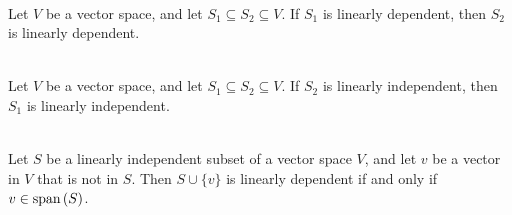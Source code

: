 \begin{theorem}
	\hfill\\
	Let $V$ be a vector space, and let $S_1 \subseteq S_2 \subseteq V$. If $S_1$ is linearly dependent, then $S_2$ is linearly dependent.
\end{theorem}

\begin{corollary}
	\hfill\\
	Let $V$ be a vector space, and let $S_1 \subseteq S_2 \subseteq V$. If $S_2$ is linearly independent, then $S_1$ is linearly independent.
\end{corollary}

\begin{theorem}
	\hfill\\
	Let $S$ be a linearly independent subset of a vector space $V$, and let $v$ be a vector in $V$ that is not in $S$. Then $S \cup \{v\}$ is linearly dependent if and only if $v \in \text{span}\left(S\right)$.
\end{theorem}
